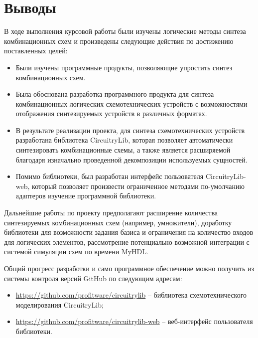 \documentclass[document.tex]{subfiles}
\begin{document}
\clearpage
\section{Выводы}
В ходе выполнения курсовой работы были изучены логические методы синтеза
комбинационных схем и произведены следующие действия по достижению поставленных
целей:

\begin{itemize}[noitemsep]
  \item Были изучены программные продукты, позволяющие упростить
  синтез комбинационных схем.
  \item Была обоснована разработка программного продукта для синтеза
  комбинационных логических схемотехнических устройств с возможностями
  отображения синтезируемых устройств в различных форматах.
  \item В результате реализации проекта, для синтеза схемотехнических устройств
  разработана библиотека CircuitryLib, которая позволяет автоматически
  синтезировать комбинационные схемы, а также является расширяемой благодаря
  изначально проведенной декомпозиции используемых сущностей.
\item Помимо библиотеки, был разработан интерфейс пользователя CircuitryLib-web,
  который позволяет произвести ограниченное методами по-умолчанию адаптеров
  изучение программной библиотеки.
\end{itemize}
 
Дальнейшие работы по проекту предполагают расширение количества синтезируемых
комбинационных схем (например, умножители), доработку библиотеки для
возможности задания базиса и ограничения на количество входов для
логических элементов, рассмотрение потенциально возможной интеграции с системой
симуляции схем по времени MyHDL. 

Общий прогресс разработки и само программное обеспечение можно получить из
системы контроля версий GitHub по следующим адресам:
\begin{itemize}[noitemsep]
  \item {\url{https://github.com/profitware/circuitrylib}} -- библиотека
  схемотехнического моделирования CircuitryLib;
  \item {\url{https://github.com/profitware/circuitrylib-web}} -- веб-интерфейс
  пользователя библиотеки.
\end{itemize}
\end{document}
